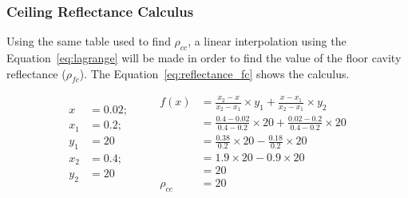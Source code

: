 \subsubsection{Ceiling Reflectance Calculus}
Using the same table used to find $\rho_{cc}$, a linear interpolation using the Equation~\ref{eq:lagrange} will be made in order to find the value of the floor cavity reflectance ($\rho_{fc}$). The Equation~\ref{eq:reflectance_fc} shows the calculus.

\begin{equation}
\begin{split}
x &= 0.02; \\
x_1 &= 0.2; \\ y_1 &= 20 \\
x_2 &= 0.4; \\ y_2 &= 20
\end{split}
\qquad
\begin{split}
f(x) &= \frac{x_2 - x}{x_2 - x_1} \times y_1 +
       \frac{x - x_1}{x_2 - x_1} \times y_2 \\
 &= \frac{0.4 - 0.02}{0.4 - 0.2} \times 20 +
    \frac{0.02 - 0.2}{0.4 - 0.2} \times 20 \\
 &= \frac{0.38}{0.2} \times 20 -
    \frac{0.18}{0.2} \times 20 \\
 & = 1.9 \times 20 - 0.9 \times 20 \\
 & = 20 \\
\rho_{cc} & = 20
\end{split}
\label{eq:reflectance_fc}
\end{equation}

